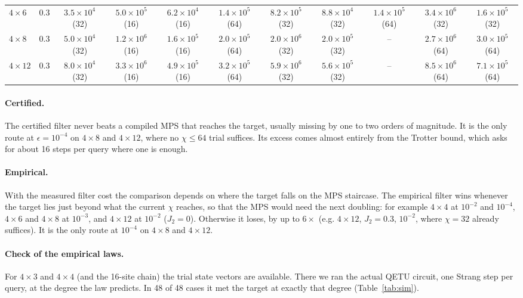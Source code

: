\documentclass[10pt]{article}
\begin{document}
\begin{table}[h]
{\begin{tabular}{lr ccc ccc ccc}
$4\times6$ & 0.3 & $3.5\times10^{4}$ (32) & $5.0\times10^{5}$ (16) & $6.2\times10^{4}$ (16) & $1.4\times10^{5}$ (64) & $8.2\times10^{5}$ (32) & $8.8\times10^{4}$ (32) & $1.4\times10^{5}$ (64) & $3.4\times10^{6}$ (32) & $1.6\times10^{5}$ (32) \\
$4\times8$ & 0.3 & $5.0\times10^{4}$ (32) & $1.2\times10^{6}$ (16) & $1.6\times10^{5}$ (16) & $2.0\times10^{5}$ (64) & $2.0\times10^{6}$ (32) & $2.0\times10^{5}$ (32) & -- & $2.7\times10^{6}$ (64) & $3.0\times10^{5}$ (64) \\
$4\times12$ & 0.3 & $8.0\times10^{4}$ (32) & $3.3\times10^{6}$ (16) & $4.9\times10^{5}$ (16) & $3.2\times10^{5}$ (64) & $5.9\times10^{6}$ (32) & $5.6\times10^{5}$ (32) & -- & $8.5\times10^{6}$ (64) & $7.1\times10^{5}$ (64) \\
\bottomrule
\end{tabular}}
\end{table}

\paragraph{Certified.} The certified filter never beats a compiled MPS that reaches the target, usually missing by
one to two orders of magnitude. It is the only route at $\epsilon=10^{-4}$ on $4\times8$ and $4\times12$, where no
$\chi\le64$ trial suffices. Its excess comes almost entirely from the Trotter bound, which asks for about
16 steps per query where one is enough.

\paragraph{Empirical.} With the measured filter cost the comparison depends on where the target falls on the
MPS staircase. The empirical filter wins whenever the target lies just beyond what the current $\chi$ reaches, so that
the MPS would need the next doubling: for example $4\times4$ at $10^{-2}$ and $10^{-4}$, $4\times6$ and $4\times8$ at
$10^{-3}$, and $4\times12$ at $10^{-2}$ ($J_2=0$). Otherwise it loses, by up to $6\times$ (e.g. $4\times12$, $J_2=0.3$,
$10^{-2}$, where $\chi=32$ already suffices). It is the only route at $10^{-4}$ on $4\times8$ and $4\times12$.

\paragraph{Check of the empirical laws.} For $4\times3$ and $4\times4$ (and the 16-site chain) the trial
state vectors are available. There we ran the actual QETU circuit, one Strang step per query, at the degree
the law predicts. In 48 of 48 cases it met the target at exactly that degree
(Table~\ref{tab:sim}).
\end{document}
